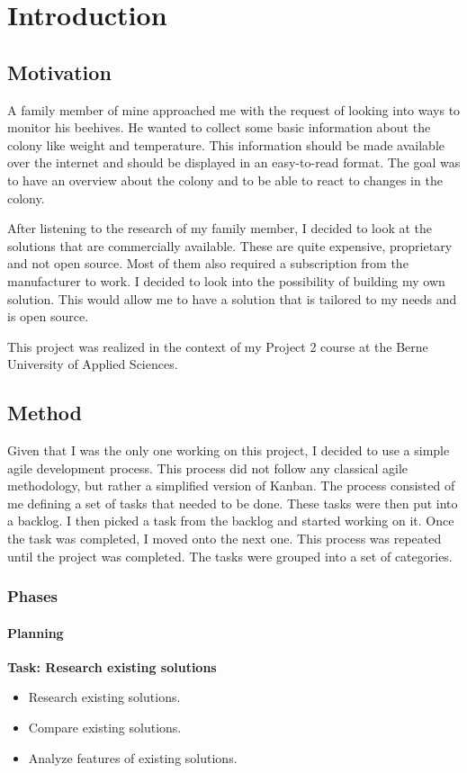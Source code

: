 \chapter{Introduction}

\section{Motivation}
A family member of mine approached me with the request of looking into ways to monitor his beehives. He wanted to collect some basic information about the colony like weight and temperature. This information should be made available over the internet and should be displayed in an easy-to-read format. The goal was to have an overview about the colony and to be able to react to changes in the colony.

After listening to the research of my family member, I decided to look at the solutions that are commercially available. These are quite expensive, proprietary and not open source. Most of them also required a subscription from the manufacturer to work. I decided to look into the possibility of building my own solution. This would allow me to have a solution that is tailored to my needs and is open source.

This project was realized in the context of my Project 2 course at the Berne University of Applied Sciences.

\newpage
\section{Method}
Given that I was the only one working on this project, I decided to use a simple agile development process. This process did not follow any classical agile methodology, but rather a simplified version of Kanban. The process consisted of me defining a set of tasks that needed to be done. These tasks were then put into a backlog. I then picked a task from the backlog and started working on it. Once the task was completed, I moved onto the next one. This process was repeated until the project was completed.
The tasks were grouped into a set of categories.

\subsection{Phases}

\subsubsection{Planning}
\textbf{Task: Research existing solutions}
\begin{itemize}
    \item Research existing solutions.
    \item Compare existing solutions.
    \item Analyze features of existing solutions.
\end{itemize}

